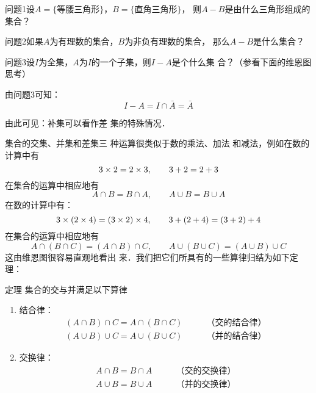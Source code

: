 \begin{blk}
    {问题1}设$A=\{\text{等腰三角形}\}$，$B=\{\text{直角三角形}\}$，
    则$A-B$是由什么三角形组成的集合？
\end{blk}


\begin{blk}
     {问题2}如果$A$为有理数的集合，$B$为非负有理数的集合，
    那么$A-B$是什么集合？
\end{blk}

\begin{blk}
     {问题3}设$I$为全集，$A$为$I$的一个子集，则$I-A$是个什么集
    合？（参看下面的维恩图思考）
\end{blk}

由问题3可知：
\[I-A=I\cap \bar A=\bar A\]

由此可见：补集可以看作差
集的特殊情况．

\begin{figure}[htp]
    \centering
{}
    \caption{}
\end{figure}


集合的交集、并集和差集三
种运算很类似于数的乘法、加法
和减法，例如在数的计算中有
\[3\times2=2\times 3,\qquad 3+2=2+3\] 
在集合的运算中相应地有\[A\cap B=B\cap A,\qquad  A\cup B=B\cup A\]
在数的计算中有：
\[3\times(2\times4)=(3\times2)\times4,\qquad 3+(2+4)=(3+2)+4\]
在集合的运算中相应地有
\[A\cap (B\cap C)=(A\cap B)\cap C,\qquad 
A\cup (B\cup C)=(A\cup B)\cup C\]
这由维恩图很容易直观地看出
来．我们把它们所具有的一些算律归结为如下定理：

\begin{blk}
{定理} 集合的交与并满足以下算律
\begin{enumerate}
\item 结合律：
\[\begin{split}
     (A\cap B)\cap C=A\cap (B\cap C)&\qquad \text{（交的结合律）}\\
     (A\cup B)\cup C=A\cup (B\cup C)&\qquad \text{（并的结合律）}
\end{split} \]
\item 交换律：
\[\begin{split}
    A\cap B=B\cap A&\qquad \text{（交的交换律）}\\
    A\cup B=B\cup A&\qquad \text{（并的交换律）}
\end{split} \]
\end{enumerate}
\end{blk}

